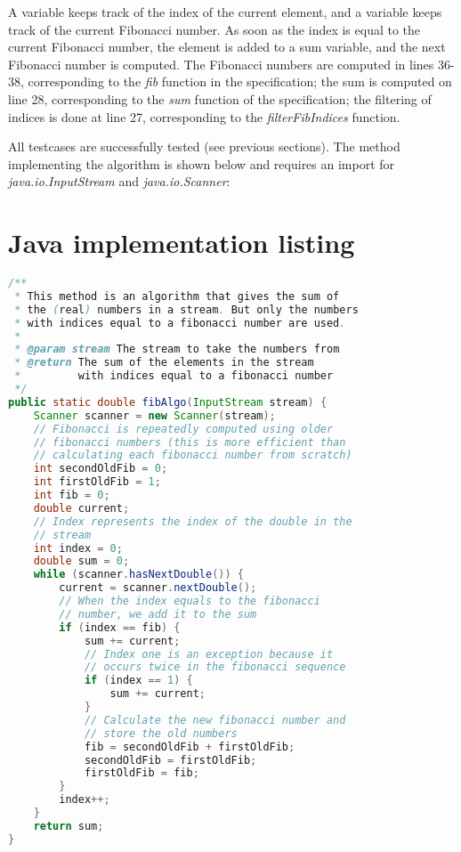\documentclass[12pt]{article}
\begin{document}
A variable keeps track of the index of the current element, and a variable keeps track of the current Fibonacci number. As soon as the index is equal to the current Fibonacci number, the element is added to a sum variable, and the next Fibonacci number is computed. The Fibonacci numbers are computed in lines 36-38, corresponding to the \textsl{fib} function in the specification; the sum is computed on line 28, corresponding to the \textsl{sum} function of the specification; the filtering of indices is done at line 27, corresponding to the \textsl{filterFibIndices} function.

All testcases are successfully tested (see previous sections). The method implementing the algorithm is shown below and requires an import for \\ \textsl{java.io.InputStream} and \textsl{java.io.Scanner}:

\appendix

\section{Java implementation listing}

\begin{lstlisting}[language=java]
/**
 * This method is an algorithm that gives the sum of
 * the (real) numbers in a stream. But only the numbers
 * with indices equal to a fibonacci number are used.
 *
 * @param stream The stream to take the numbers from
 * @return The sum of the elements in the stream
 *         with indices equal to a fibonacci number
 */
public static double fibAlgo(InputStream stream) {
    Scanner scanner = new Scanner(stream);
    // Fibonacci is repeatedly computed using older
    // fibonacci numbers (this is more efficient than
    // calculating each fibonacci number from scratch)
    int secondOldFib = 0;
    int firstOldFib = 1;
    int fib = 0;
    double current;
    // Index represents the index of the double in the
    // stream
    int index = 0;
    double sum = 0;
    while (scanner.hasNextDouble()) {
        current = scanner.nextDouble();
        // When the index equals to the fibonacci
        // number, we add it to the sum
        if (index == fib) {
            sum += current;
            // Index one is an exception because it
            // occurs twice in the fibonacci sequence
            if (index == 1) {
                sum += current;
            }
            // Calculate the new fibonacci number and
            // store the old numbers
            fib = secondOldFib + firstOldFib;
            secondOldFib = firstOldFib;
            firstOldFib = fib;
        }
        index++;
    }
    return sum;
}
\end{lstlisting}
\end{document}
